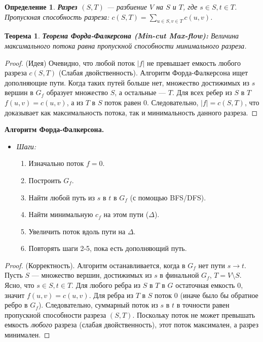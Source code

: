 \documentclass[12pt, a4paper]{article}
\newtheorem{theorem}{Теорема}
\newtheorem{definition}{Определение}
\begin{document}
\begin{definition}
\textbf{Разрез $(S, T)$} --- разбиение $V$ на $S$ и $T$, где $s \in S, t \in T$. Пропускная способность разреза: $c(S, T) = \sum_{u \in S, v \in T} c(u, v)$.
\end{definition}

\begin{theorem}
\textbf{Теорема Форда-Фалкерсона (Min-cut Max-flow):} Величина максимального потока равна пропускной способности минимального разреза.
\end{theorem}
\begin{proof}
(Идея) Очевидно, что любой поток $|f|$ не превышает емкость любого разреза $c(S, T)$ (Слабая двойственность). Алгоритм Форда-Фалкерсона ищет дополняющие пути. Когда таких путей больше нет, множество достижимых из $s$ вершин в $G_f$ образует множество $S$, а остальные --- $T$. Для всех ребер из $S$ в $T$ $f(u, v) = c(u, v)$, а из $T$ в $S$ поток равен 0. Следовательно, $|f| = c(S, T)$, что доказывает как максимальность потока, так и минимальность данного разреза.
\end{proof}

\textbf{Алгоритм Форда-Фалкерсона.}
\begin{itemize}
    \item \textit{Шаги:}
    \begin{enumerate}
        \item Изначально поток $f=0$.
        \item Построить $G_f$.
        \item Найти любой путь из $s$ в $t$ в $G_f$ (с помощью BFS/DFS).
        \item Найти минимальную $c_f$ на этом пути ($\Delta$).
        \item Увеличить поток вдоль пути на $\Delta$.
        \item Повторять шаги 2-5, пока есть дополняющий путь.
    \end{enumerate}
\end{itemize}
\begin{proof}
(Корректность). Алгоритм останавливается, когда в $G_f$ нет пути $s \to t$. Пусть $S$ --- множество вершин, достижимых из $s$ в финальной $G_f$, $T = V \setminus S$. Ясно, что $s \in S, t \in T$. Для любого ребра из $S$ в $T$ в $G$ остаточная емкость $0$, значит $f(u, v) = c(u, v)$. Для ребра из $T$ в $S$ поток 0 (иначе было бы обратное ребро в $G_f$). Следовательно, суммарный поток из $s$ в $t$ в точности равен пропускной способности разреза $(S, T)$. Поскольку поток не может превышать емкость \textit{любого} разреза (слабая двойственность), этот поток максимален, а разрез минимален.
\end{proof}
\end{document}
